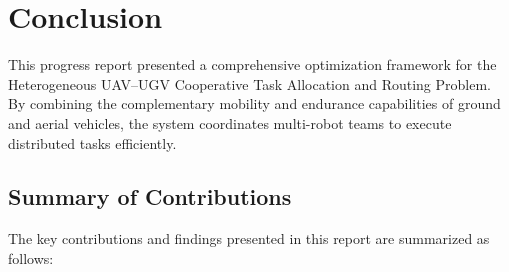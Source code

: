 \chapter{Conclusion}\label{chap:concl}

This progress report presented a comprehensive optimization framework for the Heterogeneous UAV--UGV Cooperative Task Allocation and Routing Problem. By combining the complementary mobility and endurance capabilities of ground and aerial vehicles, the system coordinates multi-robot teams to execute distributed tasks efficiently.

\section{Summary of Contributions}
The key contributions and findings presented in this report are summarized as follows:
